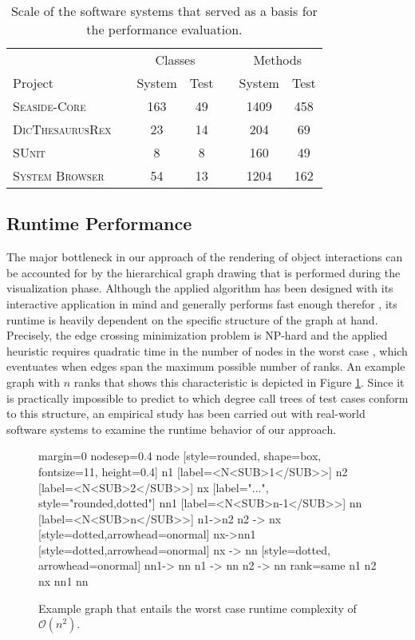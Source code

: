 \begin{table}
\centering
\begin{tabular}{lcccccc}
\toprule[1.5pt]
\phantom{abc} & \phantom{abc} & \multicolumn{2}{c}{Classes} & \phantom{abc} & \multicolumn{2}{c}{Methods}  \\
\cmidrule{3-4} \cmidrule{6-7}
Project    && System & Test && System & Test \\
\midrule
\textsc{Seaside-Core}		&&	163	&	49	&&	1409	&	458	\\
\textsc{DicThesaurusRex}	&&	23	&	14	&&	204		&	69	\\
\textsc{SUnit}				&&	8	&	8	&&	160		&	49	\\
\textsc{System Browser}		&&	54	&	13	&&	1204	&	162	\\
\bottomrule[1.5pt]
\end{tabular}
\caption[Test Subjects]{Scale of the software systems that served as a basis for the performance evaluation.}
\label{t:EvaluationProjects}
\end{table}

\subsection{Runtime Performance}
\label{ss:DiscussionPerformance}
The major bottleneck in our approach of the rendering of object interactions can be accounted for by the hierarchical graph drawing that is performed during the visualization phase.
Although the applied algorithm has been designed with its interactive application in mind and generally performs fast enough therefor \cite{gansner_technique_1993}, its runtime is heavily dependent on the specific structure of the graph at hand.
Precisely, the edge crossing minimization problem is NP-hard and the applied heuristic requires quadratic time in the number of nodes in the worst case \cite{tamassia_handbook_2013}, which eventuates when edges span the maximum possible number of ranks.
An example graph with $n$ ranks that shows this characteristic is depicted in Figure \ref{fig:graph-worst-case}.
Since it is practically impossible to predict to which degree call trees of test cases conform to this structure, an empirical study has been carried out with real-world software systems to examine the runtime behavior of our approach.

\begin{figure}[tb]
	\centering	
	{
		margin=0
		nodesep=0.4
		node [style=rounded, shape=box, fontsize=11, height=0.4]
		n1 [label=<N<SUB>1</SUB>>]
		n2 [label=<N<SUB>2</SUB>>]
		nx [label="...", style="rounded,dotted"]
		nn1 [label=<N<SUB>n-1</SUB>>]
		nn [label=<N<SUB>n</SUB>>]
		n1->n2
		n2 -> nx [style=dotted,arrowhead=onormal]
		nx->nn1 [style=dotted,arrowhead=onormal]
		nx -> nn [style=dotted, arrowhead=onormal]
		nn1-> nn
		n1 -> nn
		n2 -> nn
		{rank=same n1 n2 nx nn1 nn}
	}
	\caption{Example graph that entails the worst case runtime complexity of $\mathcal O(n^2)$.}
	\label{fig:graph-worst-case}
\end{figure}


